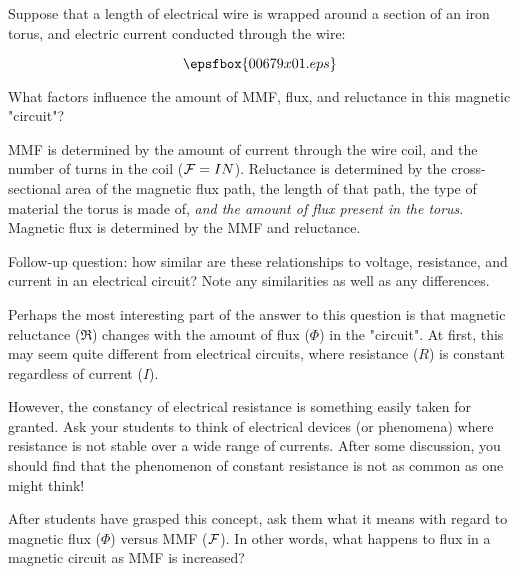 

Suppose that a length of electrical wire is wrapped around a section of an iron torus, and electric current conducted through the wire:

$$\epsfbox{00679x01.eps}$$

What factors influence the amount of MMF, flux, and reluctance in this magnetic "circuit"?







MMF is determined by the amount of current through the wire coil, and the number of turns in the coil (${\cal F} = I N$).  Reluctance is determined by the cross-sectional area of the magnetic flux path, the length of that path, the type of material the torus is made of, {\it and the amount of flux present in the torus}.  Magnetic flux is determined by the MMF and reluctance.

\vskip 10pt

Follow-up question: how similar are these relationships to voltage, resistance, and current in an electrical circuit?  Note any similarities as well as any differences.







Perhaps the most interesting part of the answer to this question is that magnetic reluctance ($\Re$) changes with the amount of flux ($\Phi$) in the "circuit".  At first, this may seem quite different from electrical circuits, where resistance ($R$) is constant regardless of current ($I$).

However, the constancy of electrical resistance is something easily taken for granted.  Ask your students to think of electrical devices (or phenomena) where resistance is not stable over a wide range of currents.  After some discussion, you should find that the phenomenon of constant resistance is not as common as one might think!

After students have grasped this concept, ask them what it means with regard to magnetic flux ($\Phi$) versus MMF (${\cal F}$).  In other words, what happens to flux in a magnetic circuit as MMF is increased?




